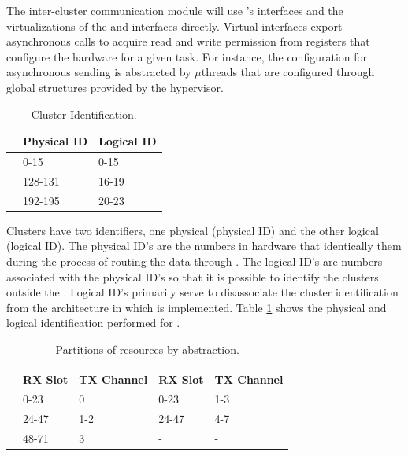 	The inter-cluster communication module will use \hal's interfaces and the
	virtualizations of the \cnoc and \dnoc interfaces directly.
	Virtual \noc interfaces export asynchronous calls to acquire read and write
	permission from registers that configure the hardware for a given task.
	For instance, the \dma configuration for asynchronous sending is abstracted by
	$\mu$threads that are configured through global structures provided by the hypervisor.

	\begin{table}[t]
		\caption{Cluster Identification.}

		\begin{tabular}{|l|l|l|}
			\hline
						         & \textbf{Physical ID} & \textbf{Logical ID} \\ \hline
			\textbf{\ccluster}   & 0-15                 & 0-15                \\ \hline
			\textbf{\iocluster0} & 128-131              & 16-19               \\ \hline
			\textbf{\iocluster1} & 192-195              & 20-23               \\ \hline
		\end{tabular}

		\label{tab.cluster-id}
	\end{table}

	Clusters have two identifiers, one physical (physical ID) and the
	other logical (logical ID).
	The physical ID's are the numbers in hardware that identically them
	during the process of routing the data through \noc.
	The logical ID's are numbers associated with the physical ID's so
	that it is possible to identify the clusters outside the \hal.
	Logical ID's primarily serve to disassociate the cluster
	identification from the architecture in which \hal is implemented.
	Table \ref{tab.cluster-id} shows the physical and logical
	identification performed for \mppa.

	\begin{table}[]
		\caption{Partitions of \noc resources by abstraction.}

		\begin{tabular}{l|l|l|l|l|}
			\cline{2-5}
										   & \multicolumn{2}{c|}{\textbf{\cnoc}} & \multicolumn{2}{c|}{\textbf{\dnoc}} \\ \cline{2-5}
										            & \textbf{RX Slot} & \textbf{TX Channel} & \textbf{RX Slot} & \textbf{TX Channel} \\ \hline
			\multicolumn{1}{|l|}{\textbf{\mailbox}} & 0-23             & 0                   & 0-23             & 1-3                 \\ \hline
			\multicolumn{1}{|l|}{\textbf{\portal}}  & 24-47            & 1-2                 & 24-47            & 4-7                 \\ \hline
			\multicolumn{1}{|l|}{\textbf{\sync}}    & 48-71            & 3                   & -                & -                   \\ \hline
		\end{tabular}

		\label{tab.noc-resources}
	\end{table}

